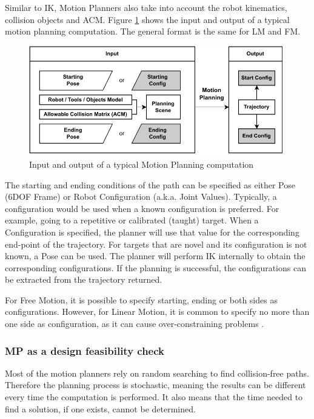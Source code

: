Similar to IK, Motion Planners also take into account the robot kinematics, collision objects and ACM. Figure \ref{fig:ik-output} shows the input and output of a typical motion planning computation. The general format is the same for LM and FM. 

\begin{figure}
    \centering
    \includegraphics[width=0.99\textwidth]{images/05/image34.pdf}
    \caption{Input and output of a typical Motion Planning computation}
    \label{fig:ik-output}
\end{figure}

The starting and ending conditions of the path can be specified as either Pose (6DOF Frame) or Robot Configuration (a.k.a. Joint Values). Typically, a configuration would be used when a known configuration is preferred. For example, going to a repetitive or calibrated (taught) target. When a Configuration is specified, the planner will use that value for the corresponding end-point of the trajectory. For targets that are novel and its configuration is not known, a Pose can be used. The planner will perform IK internally to obtain the corresponding configurations. If the planning is successful, the configurations can be extracted from the trajectory returned.

For Free Motion, it is possible to specify starting, ending or both sides as configurations. However, for Linear Motion, it is common to specify no more than one side as configuration, as it can cause over-constraining problems \parencite{berensonTaskSpaceRegions2011}.

\subsubsection{MP as a design feasibility check}
\label{subsubsection:exploration-2-mp-as-a-design-feasibility-check}

Most of the motion planners rely on random searching to find collision-free paths. Therefore the planning process is stochastic, meaning the results can be different every time the computation is performed. It also means that the time needed to find a solution, if one exists, cannot be determined.

